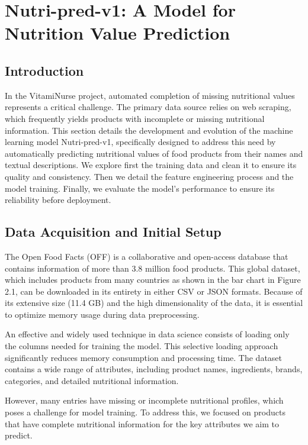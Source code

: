 \chapter{Nutri-pred-v1: A Model for Nutrition Value Prediction}

\section{Introduction}
\par In the VitamiNurse project, automated completion of missing nutritional
values represents a critical challenge. The primary data source relies
on web scraping, which frequently yields products with incomplete or
missing nutritional information. This section details the development
and evolution of the machine learning model Nutri-pred-v1, specifically
designed to address this need by automatically predicting nutritional values of food products from their names and textual descriptions. We explore first the training data and clean it to ensure its quality and consistency. 
Then we detail the feature engineering process and the model training.
Finally, we evaluate the model's performance to ensure its reliability before deployment.



\section{Data Acquisition and Initial Setup}
The Open Food Facts (OFF) is a collaborative and open-access database
that contains information of more than 3.8 million food products. This
global dataset, which includes products from many countries as shown in
the bar chart in Figure 2.1, can be downloaded in its entirety in either
CSV or JSON formats. Because of its extensive size (11.4 GB) and the
high dimensionality of the data, it is essential to optimize memory usage
during data preprocessing.

\par An effective and widely used technique in data science consists of loading
only the columns needed for training the model. This selective loading
approach significantly reduces memory consumption and processing time.
The dataset contains a wide range of attributes, including product names,
ingredients, brands, categories, and detailed nutritional information.
\par However, many entries have missing or incomplete nutritional profiles,
which poses a challenge for model training. To address this, we focused on
products that have complete nutritional information for the key attributes
we aim to predict.

